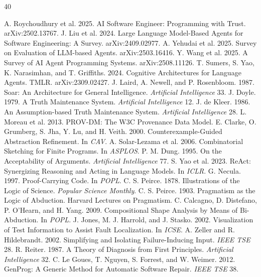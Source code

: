 \documentclass[sigconf,review,anonymous]{acmart}
\begin{document}
\begin{thebibliography}{40}

 A. Roychoudhury et al. 2025. AI Software Engineer: Programming with Trust. arXiv:2502.13767.
 J. Liu et al. 2024. Large Language Model-Based Agents for Software Engineering: A Survey. arXiv:2409.02977.
 A. Yehudai et al. 2025. Survey on Evaluation of LLM-based Agents. arXiv:2503.16416.
 Y. Wang et al. 2025. A Survey of AI Agent Programming Systems. arXiv:2508.11126.
 T. Sumers, S. Yao, K. Narasimhan, and T. Griffiths. 2024. Cognitive Architectures for Language Agents. TMLR. arXiv:2309.02427.
 J. Laird, A. Newell, and P. Rosenbloom. 1987. Soar: An Architecture for General Intelligence. \textit{Artificial Intelligence} 33.
 J. Doyle. 1979. A Truth Maintenance System. \textit{Artificial Intelligence} 12.
 J. de Kleer. 1986. An Assumption-based Truth Maintenance System. \textit{Artificial Intelligence} 28.
 L. Moreau et al. 2013. PROV-DM: The W3C Provenance Data Model.
 E. Clarke, O. Grumberg, S. Jha, Y. Lu, and H. Veith. 2000. Counterexample-Guided Abstraction Refinement. In \textit{CAV}.
 A. Solar-Lezama et al. 2006. Combinatorial Sketching for Finite Programs. In \textit{ASPLOS}.
 P. M. Dung. 1995. On the Acceptability of Arguments. \textit{Artificial Intelligence} 77.
 S. Yao et al. 2023. ReAct: Synergizing Reasoning and Acting in Language Models. In \textit{ICLR}.
 G. Necula. 1997. Proof-Carrying Code. In \textit{POPL}.
 C. S. Peirce. 1878. Illustrations of the Logic of Science. \textit{Popular Science Monthly}.
 C. S. Peirce. 1903. Pragmatism as the Logic of Abduction. Harvard Lectures on Pragmatism.
 C. Calcagno, D. Distefano, P. O'Hearn, and H. Yang. 2009. Compositional Shape Analysis by Means of Bi-Abduction. In \textit{POPL}.
 J. Jones, M. J. Harrold, and J. Stasko. 2002. Visualization of Test Information to Assist Fault Localization. In \textit{ICSE}.
 A. Zeller and R. Hildebrandt. 2002. Simplifying and Isolating Failure-Inducing Input. \textit{IEEE TSE} 28.
 R. Reiter. 1987. A Theory of Diagnosis from First Principles. \textit{Artificial Intelligence} 32.
 C. Le Goues, T. Nguyen, S. Forrest, and W. Weimer. 2012. GenProg: A Generic Method for Automatic Software Repair. \textit{IEEE TSE} 38.

\end{thebibliography}
\end{document}
